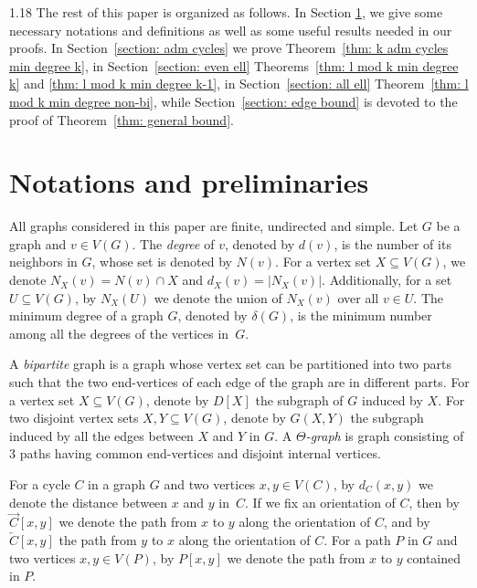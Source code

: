 \documentclass[10pt]{article}
\begin{document}
\begin{spacing}{1.18}
   The rest of this paper is organized as follows. In Section \ref{section: pre}, we give some necessary notations and definitions as well as some useful results needed in our proofs. In Section~\ref{section: adm cycles} we prove Theorem~\ref{thm: k adm cycles min degree k}, in Section~\ref{section: even ell} Theorems~\ref{thm: l mod k min degree k} and \ref{thm: l mod k min degree k-1}, in Section~\ref{section: all ell} Theorem~\ref{thm: l mod k min degree non-bi}, while Section~\ref{section: edge bound} is devoted to the proof of Theorem~\ref{thm: general bound}.
   


\section{Notations and preliminaries}\label{section: pre}

    All graphs considered in this paper are finite, undirected and simple. Let $G$ be a graph and $v\in V(G)$. The {\em degree} of $v$, denoted by $d(v)$, is the number of its neighbors in $G$, whose set is denoted by $N(v)$. For a vertex set $X\subseteq V(G)$, we denote $N_X(v) = N(v) \cap X$ and $d_X(v) = |N_X(v)|$. Additionally, for a set $U \subseteq V(G)$, by $N_X(U)$ we denote the union of $N_X(v)$ over all $v \in U$. The minimum degree of a graph $G$, denoted by $\delta(G)$, is the minimum number among all the degrees of the vertices in~$G$. 
    
    A {\em bipartite} graph is a graph whose vertex set can be partitioned into two parts such that the two end-vertices of each edge of the graph are in different parts. For a vertex set $X\subseteq V(G)$, denote by $D[X]$ the subgraph of $G$ induced by $X$. For two disjoint vertex sets $X,Y\subseteq V(G)$, denote by $G(X,Y)$ the subgraph induced by all the edges between $X$ and $Y$ in $G$. 
    A {\em $\varTheta$-graph} is graph consisting of 3 paths having common end-vertices and disjoint internal vertices.
    
    For a cycle $C$ in a graph $G$ and two vertices $x, y \in V(C)$, by $d_C(x,y)$ we denote the distance between $x$ and $y$ in~$C$. If we fix an orientation of $C$, then by $\overrightarrow{C}[x,y]$ we denote the path from $x$ to $y$ along the orientation of $C$, and by $\overleftarrow{C}[x,y]$ the path from $y$ to $x$ along the orientation of $C$.
    For a path $P$ in $G$ and two vertices $x, y \in V(P)$, by $P[x,y]$ we denote the path from $x$ to $y$ contained in $P$. 
    

\end{spacing}
\end{document}
